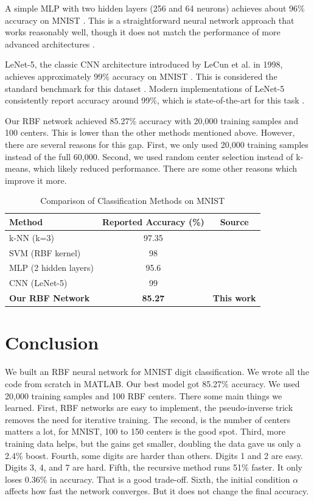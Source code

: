 \documentclass[12pt]{article}
\begin{document}
A simple MLP with two hidden layers (256 and 64 neurons) achieves about 96\% accuracy on MNIST \cite{mlp-accuracy}. This is a straightforward neural network approach that works reasonably well, though it does not match the performance of more advanced architectures \cite{mlp-pytorch}.

LeNet-5, the classic CNN architecture introduced by LeCun et al. in 1998, achieves approximately 99\% accuracy on MNIST \cite{lenet5}. This is considered the standard benchmark for this dataset \cite{lenet-pytorch}. Modern implementations of LeNet-5 consistently report accuracy around 99\%, which is state-of-the-art for this task \cite{lenet-sam}.


Our RBF network achieved 85.27\% accuracy with 20,000 training samples and 100 centers. This is lower than the other methods mentioned above. However, there are several reasons for this gap. First, we only used 20,000 training samples instead of the full 60,000. Second, we used random center selection instead of k-means, which likely reduced performance. There are some other reasons which improve it more.

\begin{table}[H]
	\centering
	\caption{Comparison of Classification Methods on MNIST}
	\begin{tabular}{lcc}
		\toprule
		\textbf{Method} & \textbf{Reported Accuracy (\%)} & \textbf{Source} \\
		\midrule
		k-NN (k=3) & 97.35 & \cite{mnist-knn} \\
		SVM (RBF kernel) & 98 & \cite{svm-rbf-98} \\
		MLP (2 hidden layers) & 95.6 & \cite{mlp-accuracy} \\
		CNN (LeNet-5) & 99 & \cite{lenet5} \\
		\textbf{Our RBF Network} & \textbf{85.27} & \textbf{This work} \\
		\bottomrule
	\end{tabular}
\end{table}

\section{Conclusion}

We built an RBF neural network for MNIST digit classification. We wrote all the code from scratch in MATLAB. Our best model got 85.27\% accuracy. We used 20,000 training samples and 100 RBF centers. There some main things we learned. First, RBF networks are easy to implement, the pseudo-inverse trick removes the need for iterative training. The second, is the number of centers matters a lot, for MNIST, 100 to 150 centers is the good spot. Third, more training data helps, but the gains get smaller, doubling the data gave us only a 2.4\% boost. Fourth, some digits are harder than others. Digits 1 and 2 are easy. Digits 3, 4, and 7 are hard. Fifth, the recursive method runs 51\% faster. It only loses 0.36\% in accuracy. That is a good trade-off. Sixth, the initial condition $\alpha$ affects how fast the network converges. But it does not change the final accuracy.
\end{document}
